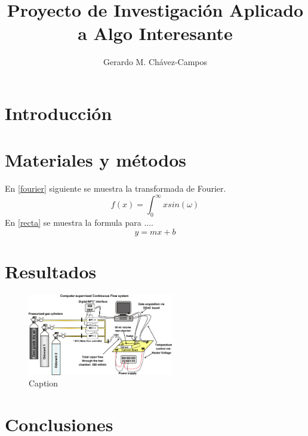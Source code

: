 \documentclass{IEEEtran}
\title{Proyecto de Investigación Aplicado a Algo Interesante}
\author{Gerardo M. Chávez-Campos}
\begin{document}
\maketitle
\section{Introducción}
\blindtext[2]
\section{Materiales y métodos}
En \eqref{fourier} siguiente se muestra la 
transformada de Fourier.
\begin{equation}
    f(x)=\int_0^{\infty}x sin(\omega)\label{fourier}
\end{equation}
En \eqref{recta} se muestra la formula para ....
\begin{equation}
    y=mx+b\label{recta}
\end{equation}

\blindtext[8]
\section{Resultados}
\blindtext[4]
\begin{figure}
    \centering
    \includegraphics[width=2.5in]{metodologia.jpg}
    \caption{Caption}
    \label{fig:my_label}
\end{figure}








\section{Conclusiones}
\blindtext[1]
\end{document}
